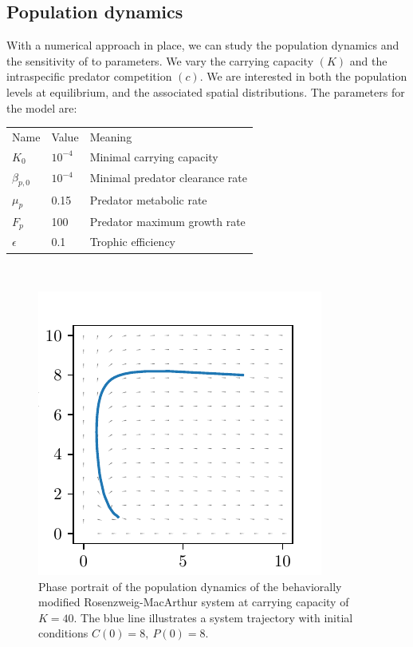\subsection{Population dynamics}
With a numerical approach in place, we can study the population dynamics and the sensitivity of  to parameters. We vary the carrying capacity $(K)$ and the intraspecific predator competition $(c)$. We are interested in both  the population levels at equilibrium, and the associated spatial distributions.
The parameters for the model are: \\
\begin{tabular}{l l l}
  Name & Value & Meaning \\
  $K_0$ & $10^{-4}$ & Minimal carrying capacity \\
  $\beta_{p,0}$ & $10^{-4}$ & Minimal predator clearance rate \\
  $\mu_p$ & 0.15 & Predator metabolic rate \\
  $F_p$ & 100 & Predator maximum growth rate \\
  $\epsilon$ & 0.1 & Trophic efficiency
\end{tabular}
\\
\begin{figure}[H]
  \caption{Phase portrait of the population dynamics of the behaviorally modified Rosenzweig-MacArthur system at carrying capacity of $K=40$. The blue line illustrates a system trajectory with initial conditions $C(0)=8,~P(0)=8$.}
  \label{fig:dynamics}
  \includegraphics{plots/dynamics.pdf}
\end{figure}
